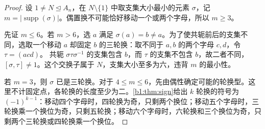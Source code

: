\begin{proof}
	设 \(1\ne N\trianglelefteq A_n\)，在 \(N\setminus\{1\}\) 中取支集大小最小的元素 \(\sigma\)，记 \(m=\bigl|\operatorname{supp}(\sigma)\bigr|\)。偶置换不可能恰好移动一个或两个字母，所以 \(m\ge3\)。

	先证 \(m\le6\)。若 \(m>6\)，选 \(a\) 满足 \(\sigma(a)=b\ne a\)。为了使共轭前后的支集不同，选取一个移动 \(a\) 却固定 \(b\) 的三轮换：取不同于 \(a,b\) 的两个字母 \(c,d\)，令 \(\tau=(acd)\)。 共轭 \(\sigma\tau\sigma^{-1}\) 的支集包含 \(b\)，而 \(\tau\) 的支集不包含 \(b\)，故二者不同，\([\sigma,\tau]\ne1\)。这个交换子属于 \(N\)，支集大小至多为六，违背 \(m\) 的最小性。

	若 \(m=3\)，则 \(\sigma\) 已是三轮换。对于 \(4\le m\le6\)，先由偶性确定可能的轮换型。这里不计固定点，各轮换的长度至少为二。\cref{b1:thm:sign}给出 \(k\) 轮换的符号为 \((-1)^{k-1}\)：移动四个字母时，四轮换为奇，只剩两个换位；移动五个字母时，三轮换乘一个换位为奇，只剩五轮换；移动六个字母时，六轮换和三个换位为奇，只剩两个三轮换或四轮换乘一个换位。


\end{proof}
